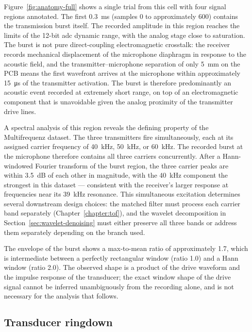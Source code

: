 Figure~\ref{fig:anatomy-full}
shows a single trial from this cell with four signal regions
annotated. The first \SI{0.3}{\milli\second} (samples 0 to
approximately 600) contains the transmission burst itself. The
recorded amplitude in this region reaches the limits of the
\num{12}-bit \gls{adc} dynamic range, with the analog stage close
to saturation. The burst is not pure direct-coupling
electromagnetic crosstalk: the receiver records mechanical
displacement of the microphone diaphragm in response to the
acoustic field, and the transmitter--microphone separation of only
\SI{5}{mm} on the PCB means the first wavefront arrives at the
microphone within approximately \SI{15}{\micro\second} of the
transmitter activation. The burst is therefore predominantly an
acoustic event recorded at extremely short range, on top of an
electromagnetic component that is unavoidable given the analog
proximity of the transmitter drive lines.

A spectral analysis of this region reveals the defining property of
the Multifrequenz dataset. The three transmitters fire
simultaneously, each at its assigned carrier frequency of
\SI{40}{kHz}, \SI{50}{kHz}, or \SI{60}{kHz}. The recorded burst at
the microphone therefore contains all three carriers concurrently.
After a Hann-windowed Fourier transform of the burst region, the
three carrier peaks are within \SI{3.5}{dB} of each other in
magnitude, with the \SI{40}{kHz} component the strongest in this
dataset --- consistent with the receiver's larger response at
frequencies near its \SI{39}{kHz} resonance.
This simultaneous excitation determines several downstream design
choices: the matched filter must process each carrier band
separately (Chapter~\ref{chapter:tof}), and the wavelet
decomposition in Section~\ref{sec:wavelet-denoising} must either
preserve all three bands or address them separately depending on
the branch used.

The envelope of the burst shows a max-to-mean ratio of
approximately \num{1.7}, which is intermediate between a perfectly
rectangular window (ratio \num{1.0}) and a Hann window (ratio
\num{2.0}). The observed shape is a product of the drive waveform
and the impulse response of the transducer; the exact window shape
of the drive signal cannot be inferred unambiguously from the
recording alone, and is not necessary for the analysis that follows.

\subsection{Transducer ringdown}
\label{sec:ringdown}


